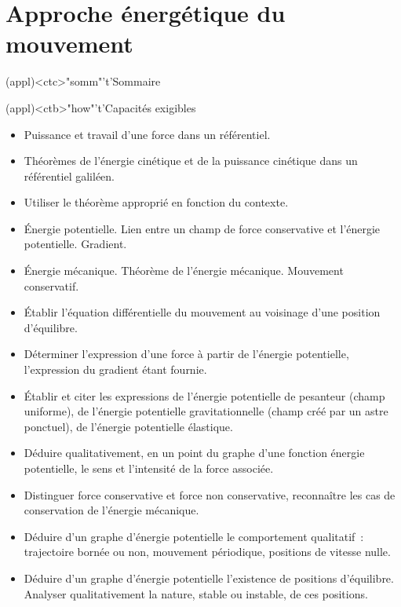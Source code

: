\documentclass[../../main/main.tex]{subfiles}
\begin{document}
\setcounter{chapter}{3}


\chapter{Approche \'energ\'etique du mouvement}

\vspace*{\fill}

\begin{tcn}(appl)<ctc>"somm"'t'{Sommaire}
	\let\item\olditem
	\vspace{-15pt}
	\minitoc
	\vspace{-25pt}
\end{tcn}

\begin{tcn}[sidebyside, fontupper=\small, fontlower=\small]
	(appl)<ctb>"how"'t'{Capacités exigibles}
	\begin{itemize}[label=\rcheck]
		\item Puissance et travail d'une force dans un référentiel.
		\item Théorèmes de l'énergie cinétique et de la puissance cinétique dans
		      un référentiel galiléen.
		\item Utiliser le théorème approprié en fonction du contexte.
		\item Énergie potentielle. Lien entre un champ de force conservative et
		      l'énergie potentielle. Gradient.
		\item Énergie mécanique. Théorème de l'énergie mécanique. Mouvement
		      conservatif.
		\item Établir l'équation différentielle du mouvement au voisinage d'une
		      position d'équilibre.
		\item Déterminer l'expression d'une force à partir de l'énergie
		      potentielle, l'expression du gradient étant fournie.
	\end{itemize}
	\tcblower
	\begin{itemize}[label=\rcheck]
		\item Établir et citer les expressions de l'énergie potentielle de
		      pesanteur (champ uniforme), de l'énergie potentielle
		      gravitationnelle (champ créé par un astre ponctuel), de l'énergie
		      potentielle élastique.
		\item Déduire qualitativement, en un point du graphe d'une fonction
		      énergie potentielle, le sens et l'intensité de la force associée.
		\item Distinguer force conservative et force non conservative, reconnaître
		      les cas de conservation de l'énergie mécanique.
		\item Déduire d'un graphe d'énergie potentielle le comportement
		      qualitatif~: trajectoire bornée ou non, mouvement périodique,
		      positions de vitesse nulle.
		\item Déduire d'un graphe d'énergie potentielle l'existence de positions
		      d'équilibre. Analyser qualitativement la nature, stable ou instable,
		      de ces positions.
	\end{itemize}
\end{tcn}
\end{document}
